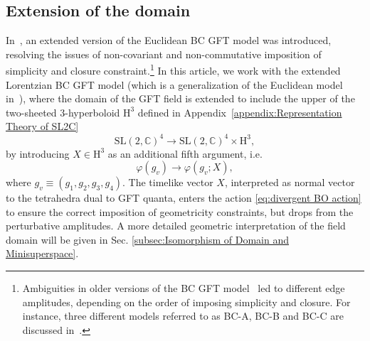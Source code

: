 \documentclass[11pt,a4paper]{article}
\newcommand{\C}{\mathbb C}
\newcommand{\SL}{\text{SL$(2,\C)$}}
\newcommand{\HH}{\text{H}^3}
\begin{document}
\subsection{Extension of the domain}

In~\cite{Baratin:2011tx}, an extended version of the Euclidean BC GFT model was introduced, resolving the issues of non-covariant and non-commutative imposition of simplicity and closure constraint.\footnote{Ambiguities in older versions of the BC GFT model~\cite{Perez:2000ec,Rovelli:2004tv} led to different edge amplitudes, depending on the order of imposing simplicity and closure. For instance, three different models referred to as BC-A, BC-B and BC-C are discussed in~\cite{Rovelli:2004tv}.} In this article, we work with the extended Lorentzian BC GFT model (which is a generalization of the Euclidean model in~\cite{Baratin:2011tx}), where the domain of the GFT field is extended to include the upper of the two-sheeted 3-hyperboloid $\HH$ defined in Appendix~\ref{appendix:Representation Theory of SL2C}
%
\begin{equation}
\SL^4\longrightarrow\SL^4\times\HH,
\end{equation}
%
by introducing $X\in\HH$ as an additional fifth argument, i.e.
%
\begin{equation}
\varphi(g_v)\longrightarrow\varphi(g_v;X),
\end{equation}
%
where $g_v\equiv (g_1,g_2,g_3,g_4)$. The timelike vector $X$, interpreted as normal vector to the tetrahedra dual to GFT quanta, enters the action \eqref{eq:divergent BO action} to ensure the correct imposition of geometricity constraints, but drops from the perturbative amplitudes. A more detailed geometric interpretation of the field domain will be given in Sec. \ref{subsec:Isomorphism of Domain and Minisuperspace}.
\end{document}
